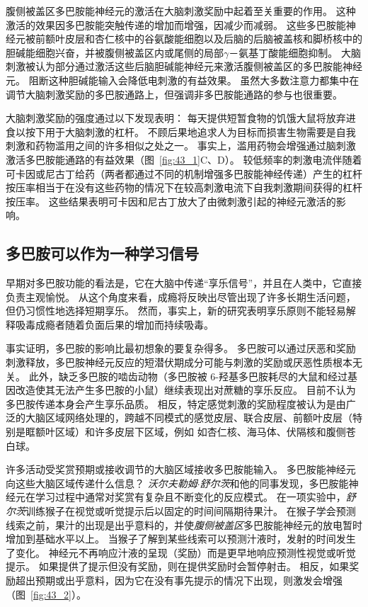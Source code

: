 腹侧被盖区多巴胺能神经元的激活在大脑刺激奖励中起着至关重要的作用。
这种激活的效果因多巴胺能突触传递的增加而增强，因减少而减弱。
这些多巴胺能神经元被前额叶皮层和杏仁核中的谷氨酸能细胞以及后脑的后脑被盖核和脚桥核中的胆碱能细胞兴奋，并被腹侧被盖区内或尾侧的局部$\gamma$－氨基丁酸能细胞抑制。
大脑刺激被认为部分通过激活这些后脑胆碱能神经元来激活腹侧被盖区的多巴胺能神经元。
阻断这种胆碱能输入会降低电刺激的有益效果。
虽然大多数注意力都集中在调节大脑刺激奖励的多巴胺通路上，但强调非多巴胺能通路的参与也很重要。


大脑刺激奖励的强度通过以下发现表明：
每天提供短暂食物的饥饿大鼠将放弃进食以按下用于大脑刺激的杠杆。
不顾后果地追求人为目标而损害生物需要是自我刺激和药物滥用之间的许多相似之处之一。
事实上，滥用药物会增强通过脑刺激激活多巴胺能通路的有益效果（图~\ref{fig:43_1}C、D）。
较低频率的刺激电流伴随着可卡因或尼古丁给药（两者都通过不同的机制增强多巴胺能神经传递）产生的杠杆按压率相当于在没有这些药物的情况下在较高刺激电流下自我刺激期间获得的杠杆按压率。
这些结果表明可卡因和尼古丁放大了由微刺激引起的神经元激活的影响。



\subsection{多巴胺可以作为一种学习信号}

早期对多巴胺功能的看法是，它在大脑中传递“享乐信号”，并且在人类中，它直接负责主观愉悦。
从这个角度来看，成瘾将反映出尽管出现了许多长期生活问题，但仍习惯性地选择短期享乐。
然而，事实上，新的研究表明享乐原则不能轻易解释吸毒成瘾者随着负面后果的增加而持续吸毒。


事实证明，多巴胺的影响比最初想象的要复杂得多。
多巴胺可以通过厌恶和奖励刺激释放，多巴胺神经元反应的短潜伏期成分可能与刺激的奖励或厌恶性质根本无关。
此外，缺乏多巴胺的啮齿动物（多巴胺被 6-羟基多巴胺耗尽的大鼠和经过基因改造使其无法产生多巴胺的小鼠）继续表现出对蔗糖的享乐反应。
目前不认为多巴胺传递本身会产生享乐品质。
相反，特定感觉刺激的奖励程度被认为是由广泛的大脑区域网络处理的，跨越不同模式的感觉皮层、联合皮层、前额叶皮层（特别是眶额叶区域）和许多皮层下区域，例如 如杏仁核、海马体、伏隔核和腹侧苍白球。


许多活动受奖赏预期或接收调节的大脑区域接收多巴胺能输入。
多巴胺能神经元向这些大脑区域传递什么信息？
\textit{沃尔夫勒姆$\cdot$舒尔茨}和他的同事发现，多巴胺能神经元在学习过程中通常对奖赏有复杂且不断变化的反应模式。
在一项实验中，\textit{舒尔茨}训练猴子在视觉或听觉提示后以固定的时间间隔期待果汁。
在猴子学会预测线索之前，果汁的出现是出乎意料的，并使\textit{腹侧被盖区}多巴胺能神经元的放电暂时增加到基础水平以上。
当猴子了解到某些线索可以预测汁液时，发射的时间发生了变化。
神经元不再响应汁液的呈现（奖励）而是更早地响应预测性视觉或听觉提示。
如果提供了提示但没有奖励，则在提供奖励时会暂停射击。
相反，如果奖励超出预期或出乎意料，因为它在没有事先提示的情况下出现，则激发会增强（图~\ref{fig:43_2}）。


